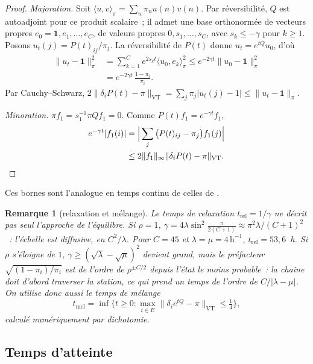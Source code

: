 \documentclass[10pt,a4paper,twocolumn]{article}
\theoremstyle{enonce}
\theoremstyle{defi}
\newtheorem{remarque}[theoreme]{Remarque}
\newcommand{\VT}{\mathrm{VT}}
\newcommand{\un}{\mathbf{1}}
\newcommand{\hr}{\,\mathrm{h}^{-1}}
\newcommand{\trel}{t_{\mathrm{rel}}}
\newcommand{\tmel}{t_{\mathrm{m\acute el}}}
\begin{document}
\begin{proof}
\emph{Majoration.} Soit $\langle u,v\rangle_\pi=\sum_n\pi_nu(n)v(n)$. Par réversibilité, $Q$ est autoadjoint pour ce produit scalaire~; il admet une base orthonormée de vecteurs propres $e_0=\un,e_1,\dots,e_C$, de valeurs propres $0,s_1,\dots,s_C$, avec $s_k\leq-\gamma$ pour $k\geq1$. Posons $u_t(j)=P(t)_{ij}/\pi_j$. La réversibilité de $P(t)$ donne $u_t=e^{tQ}u_0$, d'où
\begin{align*}
\|u_t-\un\|_\pi^2&=\sum_{k=1}^Ce^{2s_kt}\langle u_0,e_k\rangle_\pi^2\leq e^{-2\gamma t}\|u_0-\un\|_\pi^2\\
&=e^{-2\gamma t}\,\frac{1-\pi_i}{\pi_i}.
\end{align*}
Par Cauchy--Schwarz, $2\|\delta_iP(t)-\pi\|_\VT=\sum_j\pi_j|u_t(j)-1|\leq\|u_t-\un\|_\pi$.

\emph{Minoration.} $\pi f_1=s_1^{-1}\pi Qf_1=0$. Comme $P(t)f_1=e^{-\gamma t}f_1$,
\begin{align*}
e^{-\gamma t}|f_1(i)|&=\Big|\sum_j\big(P(t)_{ij}-\pi_j\big)f_1(j)\Big|\\
&\leq2\|f_1\|_\infty\|\delta_iP(t)-\pi\|_\VT.\qedhere
\end{align*}
\end{proof}

Ces bornes sont l'analogue en temps continu de celles de \cite[chap.~12]{LP17}.

\begin{remarque}[relaxation et mélange]\label{rem:melange}
Le temps de relaxation $\trel=1/\gamma$ ne décrit pas seul l'approche de l'équilibre. Si $\rho=1$, $\gamma=4\lambda\sin^2\frac{\pi}{2(C+1)}\approx\pi^2\lambda/(C+1)^2$~: l'échelle est diffusive, en $C^2/\lambda$. Pour $C=45$ et $\lambda=\mu=4\hr$, $\trel=53{,}6$~h. Si $\rho$ s'éloigne de $1$, $\gamma\geq(\sqrt\lambda-\sqrt\mu)^2$ devient grand, mais le préfacteur $\sqrt{(1-\pi_i)/\pi_i}$ est de l'ordre de $\rho^{\pm C/2}$ depuis l'état le moins probable~: la chaîne doit d'abord traverser la station, ce qui prend un temps de l'ordre de $C/|\lambda-\mu|$. On utilise donc aussi le temps de mélange
\[
\tmel=\inf\Big\{t\geq0:\max_{i\in E}\|\delta_ie^{tQ}-\pi\|_\VT\leq\tfrac14\Big\},
\]
calculé numériquement par dichotomie.
\end{remarque}

\subsection{Temps d'atteinte}\label{sec:atteinte}
\end{document}
